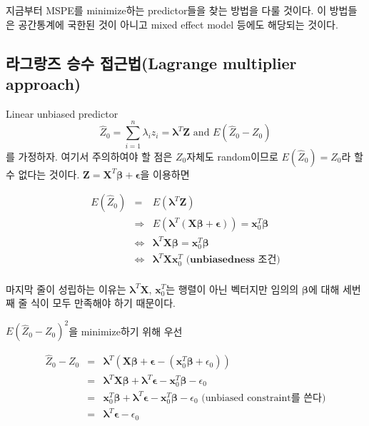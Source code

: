 \documentclass[b5paper,]{scrbook}
\theoremstyle{plain}
\theoremstyle{definition}
\numberwithin{equation}{section}
\begin{document}
지금부터 MSPE를 minimize하는 predictor들을 찾는 방법을 다룰 것이다. 이
방법들은 공간통계에 국한된 것이 아니고 mixed effect model 등에도
해당되는 것이다.

\subsection{라그랑즈 승수 접근법(Lagrange multiplier
approach)}\label{--lagrange-multiplier-approach}

Linear unbiased predictor
\[\hat{Z}_{0}=\sum_{i=1}^{n}\lambda_{i}z_{i}=\boldsymbol{\lambda}^{T}\mathbf{Z} \text{ and } E(\hat{Z}_{0}-Z_{0})\]
를 가정하자. 여기서 주의하여야 할 점은 \(Z_{0}\)자체도 random이므로
\(E(\hat{Z}_{0})=Z_{0}\)라 할 수 없다는 것이다.
\(\mathbf{Z}=\boldsymbol{X}^{T}\boldsymbol{\beta}+\boldsymbol{\epsilon}\)을
이용하면

\begin{eqnarray*}
E(\hat{Z}_{0})&=&E(\boldsymbol{\lambda}^{T}\mathbf{Z})\\
&\Longrightarrow& E(\boldsymbol{\lambda}^{T}(\mathbf{X}\boldsymbol{\beta}+\boldsymbol{\epsilon}))=\mathbf{x}_{0}^{T}\boldsymbol{\beta}\\
&\Longleftrightarrow& \boldsymbol{\lambda}^{T}\mathbf{X}\boldsymbol{\beta}=\mathbf{x}_{0}^{T}\boldsymbol{\beta}\\
&\Longleftrightarrow& \boldsymbol{\lambda}^{T}\mathbf{X}\mathbf{x}_{0}^{T} \textbf{ (unbiasedness 조건)}\\
\end{eqnarray*}

마지막 줄이 성립하는 이유는 \(\boldsymbol{\lambda}^{T}\mathbf{X}\),
\(\mathbf{x}_{0}^{T}\)는 행렬이 아닌 벡터지만 임의의
\(\boldsymbol{\beta}\)에 대해 세번째 줄 식이 모두 만족해야 하기
때문이다.

\(E(\hat{Z}_{0}-Z_{0})^{2}\)을 minimize하기 위해 우선

\begin{eqnarray*}
\hat{Z}_{0}-Z_{0} &=& \boldsymbol{\lambda}^{T}(\mathbf{X}\boldsymbol{\beta}+\boldsymbol{\epsilon}-(\mathbf{x}_{0}^{T}\boldsymbol{\beta}+\epsilon_{0}))\\
&=&\boldsymbol{\lambda}^{T}\mathbf{X}\boldsymbol{\beta}+\boldsymbol{\lambda}^{T}\boldsymbol{\epsilon}-\mathbf{x}_{0}^{T}\boldsymbol{\beta}-\epsilon_{0}\\
&=&\mathbf{x}_{0}^{T}\boldsymbol{\beta}+\boldsymbol{\lambda}^{T}\boldsymbol{\epsilon}-\mathbf{x}_{0}^{T}\boldsymbol{\beta}-\epsilon_{0}\text{ (unbiased constraint를 쓴다)}\\
&=&\boldsymbol{\lambda}^{T}\boldsymbol{\epsilon}-\epsilon_{0}
\end{eqnarray*}
\end{document}
